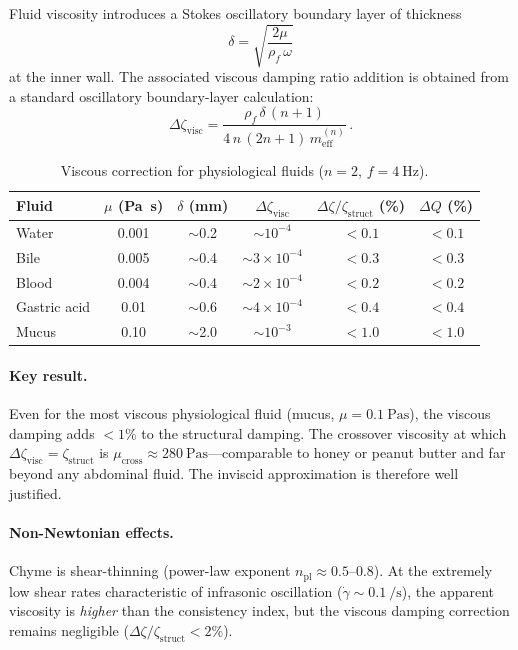 \documentclass[12pt]{article}
\begin{document}
Fluid viscosity introduces a Stokes oscillatory boundary layer of thickness
\begin{equation}
  \delta = \sqrt{\frac{2\mu}{\rho_{f}\,\omega}}
  \tag{S21}
\end{equation}
at the inner wall.  The associated viscous damping ratio addition is obtained
from a standard oscillatory boundary-layer calculation:
\begin{equation}
  \Delta\zeta_{\mathrm{visc}} = \frac{\rho_{f}\,\delta\,(n+1)}{4\,n\,(2n+1)\,m_{\mathrm{eff}}^{(n)}} \,.
  \tag{S22}
\end{equation}

\begin{table}[htbp]
\centering
\caption{Viscous correction for physiological fluids ($n=2$, $f=\SI{4}{\hertz}$).}
\label{tab:viscous}
\begin{tabular}{@{}lSSSSS@{}}
\toprule
{Fluid} & {$\mu$ (\si{\pascal\second})} & {$\delta$ (\si{\milli\metre})}
  & {$\Delta\zeta_{\mathrm{visc}}$} & {$\Delta\zeta/\zeta_{\mathrm{struct}}$ (\%)}
  & {$\Delta Q$ (\%)} \\
\midrule
Water         & 0.001 & {$\sim$0.2}  & {$\sim 10^{-4}$} & {$<0.1$}  & {$<0.1$} \\
Bile          & 0.005 & {$\sim$0.4}  & {$\sim 3\times10^{-4}$} & {$<0.3$} & {$<0.3$} \\
Blood         & 0.004 & {$\sim$0.4}  & {$\sim 2\times10^{-4}$} & {$<0.2$} & {$<0.2$} \\
Gastric acid  & 0.01  & {$\sim$0.6}  & {$\sim 4\times10^{-4}$} & {$<0.4$} & {$<0.4$} \\
Mucus         & 0.10  & {$\sim$2.0}  & {$\sim 10^{-3}$} & {$<1.0$}  & {$<1.0$} \\
\bottomrule
\end{tabular}
\end{table}

\paragraph{Key result.}
Even for the most viscous physiological fluid (mucus,
$\mu = \SI{0.1}{\pascal\second}$), the viscous damping adds
$<1\%$ to the structural damping.  The crossover viscosity at which
$\Delta\zeta_{\mathrm{visc}} = \zeta_{\mathrm{struct}}$ is
$\mu_{\mathrm{cross}} \approx \SI{280}{\pascal\second}$---comparable to
honey or peanut butter and far beyond any abdominal fluid.  The inviscid
approximation is therefore well justified.

\paragraph{Non-Newtonian effects.}
Chyme is shear-thinning (power-law exponent $n_{\mathrm{pl}} \approx 0.5$--$0.8$).
At the extremely low shear rates characteristic of infrasonic oscillation
($\dot{\gamma} \sim \SI{0.1}{\per\second}$), the apparent viscosity is
\emph{higher} than the consistency index, but the viscous damping correction
remains negligible ($\Delta\zeta/\zeta_{\mathrm{struct}} < 2\%$).
\end{document}
